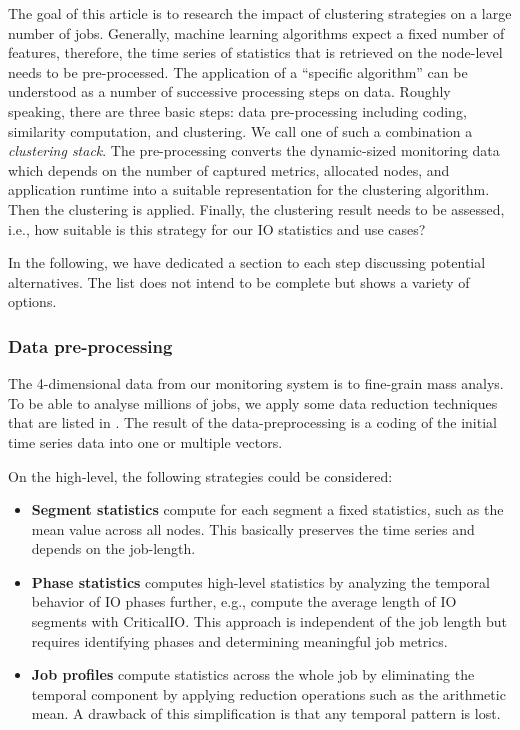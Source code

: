 \documentclass[]{llncs}
\begin{document}
The goal of this article is to research the impact of clustering strategies on a large number of jobs. Generally, machine learning algorithms expect a fixed number of features, therefore, the time series of statistics that is retrieved on the node-level needs to be pre-processed.
The application of a “specific algorithm” can be understood as a number of successive processing steps on data. Roughly speaking, there are three basic steps: data pre-processing including coding, similarity computation, and clustering. 
We call one of such a combination a \textit{clustering stack}.
The pre-processing converts the dynamic-sized monitoring data which depends on the number of captured metrics, allocated nodes, and application runtime into a suitable representation for the clustering algorithm.
Then the clustering is applied. Finally, the clustering result needs to be assessed, i.e., how suitable is this strategy for our IO statistics and use cases?

In the following, we have dedicated a section to each step discussing potential alternatives. The list does not intend to be complete but shows a variety of options.

\subsubsection{Data pre-processing}
The 4-dimensional data from our monitoring system is to fine-grain mass analys. To be able to analyse millions of jobs, we apply some data reduction techniques that are listed in .
The result of the data-preprocessing is a coding of the initial time series data into one or multiple vectors.

On the high-level, the following strategies could be considered:
\begin{itemize}
	\item \textbf{Segment statistics} compute for each segment a fixed statistics, such as the mean value across all nodes.
		This basically preserves the time series and depends on the job-length.
	\item \textbf{Phase statistics} computes high-level statistics by analyzing the temporal behavior of IO phases further, e.g., compute the average length of IO segments with CriticalIO.
		This approach is independent of the job length but requires identifying phases and determining meaningful job metrics.
	\item \textbf{Job profiles} compute statistics across the whole job by eliminating the temporal component by applying reduction operations such as the arithmetic mean.
		A drawback of this simplification is that any temporal pattern is lost.
\end{itemize}
\end{document}
